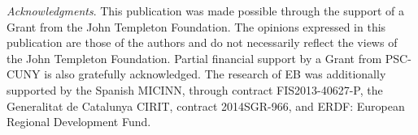 \documentclass[aps,prl,twocolumn,showpacs]{revtex4}
\begin{document}

%
%  

\begin{acknowledgments}
\emph{Acknowledgments}. This publication was made possible through the support of a Grant from the John Templeton Foundation. The opinions expressed in this publication are those of the authors and do not necessarily reflect the views of the John Templeton Foundation. Partial financial support by a Grant from PSC-CUNY is also gratefully acknowledged. The research of EB was additionally supported by 
the Spanish MICINN, through contract FIS2013-40627-P, the Generalitat de
Catalunya CIRIT, contract  2014SGR-966, and ERDF: European Regional Development Fund.
\end{acknowledgments}





%
%  
\end{document}
